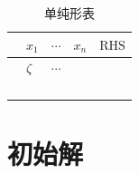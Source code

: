 \documentclass[lang = cn, scheme = chinese, thmcnt = section]{elegantbook}
\begin{document}
\begin{table}[H]
	\centering
	\caption{单纯形表}
	\renewcommand{\arraystretch}{1.5}
	\begin{tabular}{>{\centering\arraybackslash}m{1cm}>{\centering\arraybackslash}m{1cm}>{\centering\arraybackslash}m{1cm}>{\centering\arraybackslash}m{1cm}>{\centering\arraybackslash}m{1cm}}
		& $x_1$                              & $\cdots$                   & $x_n$                                                   & $\text{RHS}$                          \\ \cline{2-5} 
		\multicolumn{1}{c|}{}          & {\color[HTML]{333333} $\zeta$}     & $\cdots$                   & \multicolumn{1}{c|}{$\zeta_n$}                          & \multicolumn{1}{c|}{$z$}              \\ \cline{2-5} 
		\multicolumn{1}{c|}{$x_{r_1}$} &                                    &                            & \multicolumn{1}{c|}{}                                   & \multicolumn{1}{c|}{$\overline{b}_1$} \\
		\multicolumn{1}{c|}{$\vdots$}  &                                    &                            & \multicolumn{1}{c|}{}                                   & \multicolumn{1}{c|}{$\vdots$}         \\
		\multicolumn{1}{c|}{$x_{r_n}$} & \multirow{-3}{*}{$\overline{A}_1$} & \multirow{-3}{*}{$\cdots$} & \multicolumn{1}{c|}{\multirow{-3}{*}{$\overline{A}_n$}} & \multicolumn{1}{c|}{$\overline{b}_m$} \\ \cline{2-5} 
	\end{tabular}
\end{table}

\section{初始解}
\end{document}
